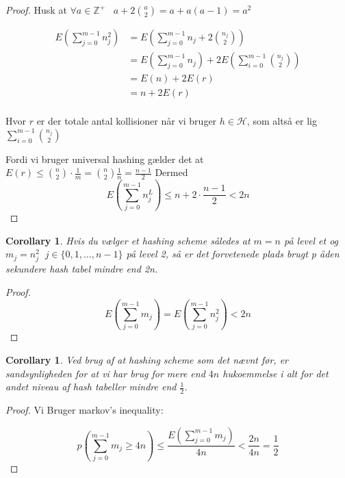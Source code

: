 \documentclass[11pt]{article}
\newtheorem{corollary}[theorem]{Corollary}
\theoremstyle{definition}
\theoremstyle{remark}
\begin{document}
\begin{proof}
  Husk at $\forall a \in \mathbb{Z}^{+}\;\;\; a + 2 \binom{a}{2} = a + a(a-1) = a^{2}$

  \begin{equation}
    \label{}
\begin{split}
  E \left( \sum_{j=0}^{m-1}n_{j}^{2} \right) &= E \left( \sum_{j=0}^{m-1} n_{j} + 2 \binom{n_{j}}{2} \right)\\
                                          &= E \left( \sum_{j=0}^{m-1}n_{j} \right) + 2E(\sum_{i=0}^{m-1}\binom{n_{j}}{2})\\
                                          &= E(n) + 2E(r)\\
  &= n + 2 E(r)\\
\end{split}
  \end{equation}

  Hvor $r$ er der totale antal kollisioner når vi bruger $h \in \mathcal{H}$, som altså er lig $\sum_{i=0}^{m-1}\binom{n_{j}}{2}$

  Fordi vi bruger universal hashing gælder det at $E(r) \leq \binom{n}{2} \cdot \frac{1}{m} = \binom{n}{2} \frac{1}{n} = \frac{n-1}{2}$
  Dermed \[ E \left( \sum_{j=0}^{m-1}n_{j}^{L} \right) \leq n + 2 \cdot \frac{n-1}{2} < 2n\]
\end{proof}

\begin{corollary}
  Hvis du vælger et hashing scheme således at $m = n$ på level et og $m_{j} = n_{j}^{2}\;\;j \in \{0,1, \ldots, n-1\}$ på level 2, så er det forvetenede plads brugt p åden sekundere hash tabel mindre end 2n. 
\end{corollary}

\begin{proof}
\[ E(\sum_{j=0}^{m-1}m_{j}) = E \left( \sum_{j=0}^{m-1}n_{j}^{2} \right) < 2n\]
\end{proof}

\begin{corollary}
Ved brug af at hashing scheme som det nævnt før, er sandsynligheden for at vi har brug for mere end $4n$ hukoemmelse i alt for det andet niveau af hash tabeller mindre end $\frac{1}{2}$.
\end{corollary}

\begin{proof}
  Vi Bruger markov's inequality:


  \begin{equation}
p \left( \sum_{j=0}^{m-1} m_{j} \geq 4n \right) \leq \frac{E \left( \sum_{j=0}^{m-1}m_{j} \right)}{4n} < \frac{2n}{4n} = \frac{1}{2}
  \end{equation}

\end{proof}
\end{document}

